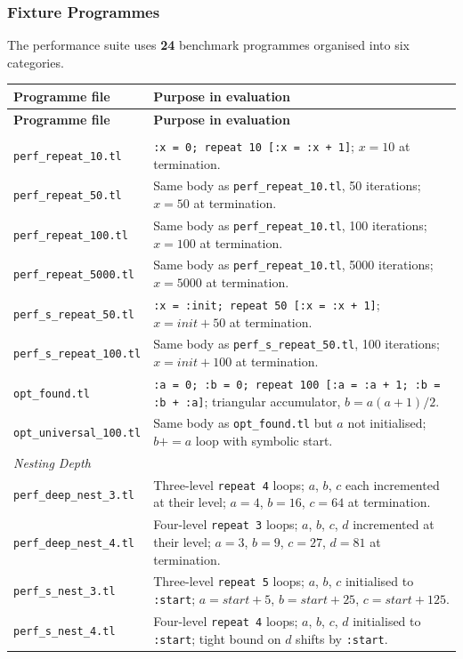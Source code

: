 \subsubsection*{Fixture Programmes}

The performance suite uses \textbf{24} benchmark programmes organised into six categories.

{\small
\begin{longtable}{p{} p{}}
\toprule
\textbf{Programme file} & \textbf{Purpose in evaluation} \\
\midrule
\endfirsthead
\toprule
\textbf{Programme file} & \textbf{Purpose in evaluation} \\
\midrule
\endhead
\midrule
\endfoot
\bottomrule
\endlastfoot

\multicolumn{2}{l}{\textit{Loop Scaling}} \\
\midrule
\texttt{perf\_repeat\_10.tl}     & \texttt{:x = 0; repeat 10 [:x = :x + 1]}; $x{=}10$ at termination. \\
\texttt{perf\_repeat\_50.tl}     & Same body as \texttt{perf\_repeat\_10.tl}, 50 iterations; $x{=}50$ at termination. \\
\texttt{perf\_repeat\_100.tl}    & Same body as \texttt{perf\_repeat\_10.tl}, 100 iterations; $x{=}100$ at termination. \\
\texttt{perf\_repeat\_5000.tl}   & Same body as \texttt{perf\_repeat\_10.tl}, 5000 iterations; $x{=}5000$ at termination. \\
\texttt{perf\_s\_repeat\_50.tl}  & \texttt{:x = :init; repeat 50 [:x = :x + 1]}; $x{=}\mathit{init}{+}50$ at termination. \\
\texttt{perf\_s\_repeat\_100.tl} & Same body as \texttt{perf\_s\_repeat\_50.tl}, 100 iterations; $x{=}\mathit{init}{+}100$ at termination. \\
\texttt{opt\_found.tl}           & \texttt{:a = 0; :b = 0; repeat 100 [:a = :a + 1; :b = :b + :a]}; triangular accumulator, $b{=}a(a{+}1)/2$. \\
\texttt{opt\_universal\_100.tl}  & Same body as \texttt{opt\_found.tl} but $a$ not initialised; $b{+}{=}a$ loop with symbolic start. \\

\midrule
\multicolumn{2}{l}{\textit{Nesting Depth}} \\
\midrule
\texttt{perf\_deep\_nest\_3.tl}  & Three-level \texttt{repeat 4} loops; $a$, $b$, $c$ each incremented at their level; $a{=}4$, $b{=}16$, $c{=}64$ at termination. \\
\texttt{perf\_deep\_nest\_4.tl}  & Four-level \texttt{repeat 3} loops; $a$, $b$, $c$, $d$ incremented at their level; $a{=}3$, $b{=}9$, $c{=}27$, $d{=}81$ at termination. \\
\texttt{perf\_s\_nest\_3.tl}     & Three-level \texttt{repeat 5} loops; $a$, $b$, $c$ initialised to \texttt{:start}; $a{=}\mathit{start}{+}5$, $b{=}\mathit{start}{+}25$, $c{=}\mathit{start}{+}125$. \\
\texttt{perf\_s\_nest\_4.tl}     & Four-level \texttt{repeat 4} loops; $a$, $b$, $c$, $d$ initialised to \texttt{:start}; tight bound on $d$ shifts by \texttt{:start}. \\


\end{longtable}}
